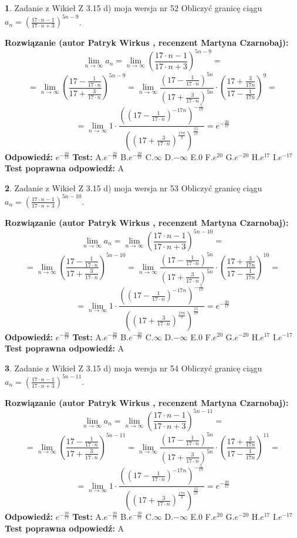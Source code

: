 \documentclass[12pt, a4paper]{article}
\theoremstyle{definition} %
\newtheorem{zad}{}
\newcommand{\zadStart}[1]{\begin{zad}#1\newline}
\newcommand{\zadStop}{\end{zad}}
\newcommand{\rozwStart}[2]{\noindent \textbf{Rozwiązanie (autor #1 , recenzent #2): }\newline}
\newcommand{\rozwStop}{\newline}
\newcommand{\odpStart}{\noindent \textbf{Odpowiedź:}\newline}
\newcommand{\odpStop}{\newline}
\newcommand{\testStart}{\noindent \textbf{Test:}\newline}
\newcommand{\testStop}{\newline}
\newcommand{\kluczStart}{\noindent \textbf{Test poprawna odpowiedź:}\newline}
\newcommand{\kluczStop}{\newline}
\begin{document}
\zadStart{Zadanie z Wikieł Z 3.15 d) moja wersja nr 52}
Obliczyć granicę ciągu $a_{n}=(\frac{17\cdot n - 1}{17 \cdot n + 3})^{5n-9}$.
\zadStop
\rozwStart{Patryk Wirkus}{Martyna Czarnobaj}
$$\lim\limits_{n\to\infty} a_{n} = \lim\limits_{n\to\infty}(\frac{17\cdot n - 1}{17 \cdot n + 3})^{5n-9}=$$
$$=\lim\limits_{n\to\infty}(\frac{17 - \frac{1}{17\cdot n}}{17 + \frac{3}{17 \cdot n}})^{5n-9}=\lim\limits_{n\to\infty}\frac{(17 - \frac{1}{17\cdot n})^{5n}}{(17 + \frac{3}{17\cdot n})^{5n}} \cdot (\frac{17+\frac{3}{17n}}{17-\frac{1}{17n}})^{9}=$$
$$=\lim\limits_{n\to\infty} 1 \cdot \frac{((17-\frac{1}{17 \cdot n})^{-17n})^{-\frac{5}{17}}}{((17+\frac{3}{17 \cdot n})^{\frac{17n}{3}})^{\frac{15}{17}}} =e^{-\frac{20}{17}}$$
\rozwStop
\odpStart
$e^{-\frac{20}{17}}$
\odpStop
\testStart
A.$ e^{-\frac{20}{17}}$
B.$ e^{-\frac{20}{17}}$
C.$\infty$
D.$-\infty$
E.$0$
F.$e^{20}$
G.$e^{-20}$
H.$e^{17}$
I.$e^{-17}$
\testStop
\kluczStart
A
\kluczStop



\zadStart{Zadanie z Wikieł Z 3.15 d) moja wersja nr 53}
Obliczyć granicę ciągu $a_{n}=(\frac{17\cdot n - 1}{17 \cdot n + 3})^{5n-10}$.
\zadStop
\rozwStart{Patryk Wirkus}{Martyna Czarnobaj}
$$\lim\limits_{n\to\infty} a_{n} = \lim\limits_{n\to\infty}(\frac{17\cdot n - 1}{17 \cdot n + 3})^{5n-10}=$$
$$=\lim\limits_{n\to\infty}(\frac{17 - \frac{1}{17\cdot n}}{17 + \frac{3}{17 \cdot n}})^{5n-10}=\lim\limits_{n\to\infty}\frac{(17 - \frac{1}{17\cdot n})^{5n}}{(17 + \frac{3}{17\cdot n})^{5n}} \cdot (\frac{17+\frac{3}{17n}}{17-\frac{1}{17n}})^{10}=$$
$$=\lim\limits_{n\to\infty} 1 \cdot \frac{((17-\frac{1}{17 \cdot n})^{-17n})^{-\frac{5}{17}}}{((17+\frac{3}{17 \cdot n})^{\frac{17n}{3}})^{\frac{15}{17}}} =e^{-\frac{20}{17}}$$
\rozwStop
\odpStart
$e^{-\frac{20}{17}}$
\odpStop
\testStart
A.$ e^{-\frac{20}{17}}$
B.$ e^{-\frac{20}{17}}$
C.$\infty$
D.$-\infty$
E.$0$
F.$e^{20}$
G.$e^{-20}$
H.$e^{17}$
I.$e^{-17}$
\testStop
\kluczStart
A
\kluczStop



\zadStart{Zadanie z Wikieł Z 3.15 d) moja wersja nr 54}
Obliczyć granicę ciągu $a_{n}=(\frac{17\cdot n - 1}{17 \cdot n + 3})^{5n-11}$.
\zadStop
\rozwStart{Patryk Wirkus}{Martyna Czarnobaj}
$$\lim\limits_{n\to\infty} a_{n} = \lim\limits_{n\to\infty}(\frac{17\cdot n - 1}{17 \cdot n + 3})^{5n-11}=$$
$$=\lim\limits_{n\to\infty}(\frac{17 - \frac{1}{17\cdot n}}{17 + \frac{3}{17 \cdot n}})^{5n-11}=\lim\limits_{n\to\infty}\frac{(17 - \frac{1}{17\cdot n})^{5n}}{(17 + \frac{3}{17\cdot n})^{5n}} \cdot (\frac{17+\frac{3}{17n}}{17-\frac{1}{17n}})^{11}=$$
$$=\lim\limits_{n\to\infty} 1 \cdot \frac{((17-\frac{1}{17 \cdot n})^{-17n})^{-\frac{5}{17}}}{((17+\frac{3}{17 \cdot n})^{\frac{17n}{3}})^{\frac{15}{17}}} =e^{-\frac{20}{17}}$$
\rozwStop
\odpStart
$e^{-\frac{20}{17}}$
\odpStop
\testStart
A.$ e^{-\frac{20}{17}}$
B.$ e^{-\frac{20}{17}}$
C.$\infty$
D.$-\infty$
E.$0$
F.$e^{20}$
G.$e^{-20}$
H.$e^{17}$
I.$e^{-17}$
\testStop
\kluczStart
A
\kluczStop
\end{document}
